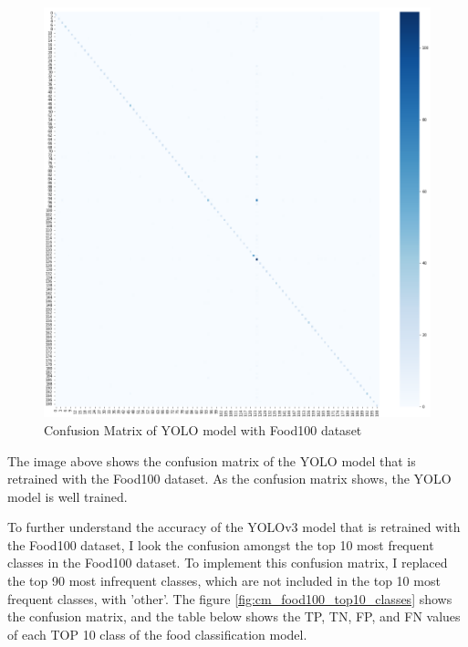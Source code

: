 \documentclass{article}
\begin{document}
\begin{figure}[H]
    \centering
    \includegraphics[scale=0.6]{imgs/cm_food100.png}
    \caption{Confusion Matrix of YOLO model with Food100 dataset}
    \label{fig:cm_food100}
\end{figure}

The image above shows the confusion matrix of the YOLO model that is retrained with the Food100 dataset. As the confusion matrix shows, the YOLO model is well trained.

To further understand the accuracy of the YOLOv3 model that is retrained with the Food100 dataset, I look the confusion amongst the top 10 most frequent classes in the Food100 dataset. To implement this confusion matrix, I replaced the top 90 most infrequent classes, which are not included in the top 10 most frequent classes, with 'other'. The figure \ref{fig:cm_food100_top10_classes} shows the confusion matrix, and the table below shows the TP, TN, FP, and FN values of each TOP 10 class of the food classification model.
\end{document}
